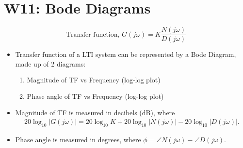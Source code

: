 \documentclass[a4paper]{article}
\begin{document}
\section{W11: Bode Diagrams}
$$\text{Transfer function, }G(j\omega) = K\frac{N(j\omega)}{D(j\omega)}$$
\begin{itemize}
    \item Transfer function of a LTI system can be represented by a Bode Diagram, made up of 2 diagrams:
    \begin{enumerate}
        \item Magnitude of TF vs Frequency (log-log plot)
        \item Phase angle of TF vs Frequency (log-log plot)
    \end{enumerate}
    \item Magnitude of TF is measured in decibels (dB), where
    \begin{align*}
        20\log_{10}|G(j\omega)| = 20\log_{10}K+20\log_{10}|N(j\omega)|-20\log_{10}|D(j\omega)|.
    \end{align*}
    \item Phase angle is measured in degrees, where $\phi = \angle N(j\omega)-\angle D(j\omega)$.
\end{itemize}
\end{document}
